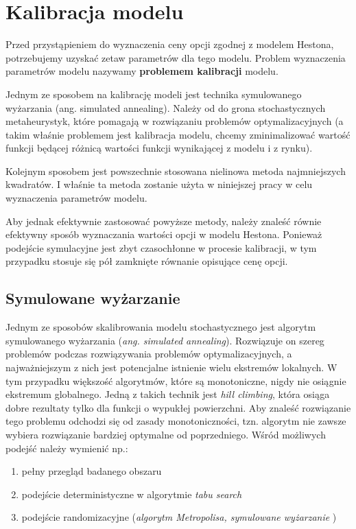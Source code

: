 \documentclass{pracamgr}
\begin{document}
\chapter{Kalibracja modelu}
\label{chap:chapterModelCalibration}

Przed przystąpieniem do wyznaczenia ceny opcji zgodnej z modelem Hestona, potrzebujemy uzyskać zetaw parametrów dla tego modelu. 
Problem wyznaczenia parametrów modelu nazywamy \textbf{problemem kalibracji} modelu.  

Jednym ze sposobem na kalibrację modeli jest technika symulowanego wyżarzania (ang. simulated annealing). Należy od do grona stochastycznych metaheurystyk, które pomagają w rozwiązaniu problemów optymalizacyjnych (a takim właśnie problemem jest kalibracja modelu, chcemy zminimalizować wartość funkcji będącej różnicą wartości funkcji wynikającej z modelu i z rynku).

Kolejnym sposobem jest powszechnie stosowana nielinowa metoda najmniejszych kwadratów. I właśnie ta metoda zostanie użyta w niniejszej pracy w celu wyznaczenia parametrów modelu.

Aby jednak efektywnie zastosować powyższe metody, należy znaleść równie efektywny sposób wyznaczania wartości opcji w modelu Hestona. Ponieważ podejście symulacyjne jest zbyt czasochłonne w procesie kalibracji, w tym przypadku stosuje się pół zamknięte równanie opisujące cenę opcji.

\section{Symulowane wyżarzanie}

Jednym ze sposobów skalibrowania modelu stochastycznego jest algorytm symulowanego wyżarzania  (\textit{ang. simulated annealing}). Rozwiązuje on szereg problemów podczas rozwiązywania problemów optymalizacyjnych, a najważniejszym z nich jest potencjalne istnienie wielu ekstremów lokalnych.
W tym przypadku większość algorytmów, które są monotoniczne, nigdy nie osiągnie ekstremum globalnego. Jedną z takich technik jest \textit{hill climbing}, która osiąga dobre rezultaty tylko dla funkcji o wypukłej powierzchni. Aby znaleść rozwiązanie tego problemu odchodzi się od zasady monotoniczności, tzn. algorytm nie zawsze wybiera rozwiązanie bardziej optymalne od poprzedniego. 
Wśród możliwych podejść należy wymienić np.:
\begin{enumerate}
  \item pełny przegląd badanego obszaru
  \item podejście deterministyczne w algorytmie \textit{tabu search}
  \item podejście randomizacyjne (\textit{algorytm Metropolisa, symulowane wyżarzanie} \cite{OptimalizationBySimulatedAnnealing} )
\end{enumerate}
\end{document}
